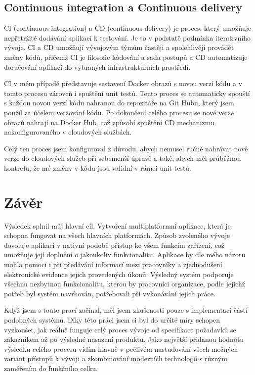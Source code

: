 \documentclass[
  biblatex,
  glossaries,
  index
]{kidiplom}
\begin{document}
\subsection{Continuous integration a Continuous delivery}
CI (continuous integration) a CD (continuous delivery) je proces, který umožňuje nepřetržité dodávání aplikací k testování. Je to v podstatě podmínka iterativního vývoje. CI a CD umožňují vývojovým týmům častěji a spolehlivěji provádět změny kódů, přičemž CI je filosofie kódování a sada postupů a CD automatizuje doručování aplikací do vybraných infrastrukturních prostředí. \cite{19}

CI v mém případě představuje sestavení Docker obrazů s novou verzí kódu a v tomto procesu zároveň i spuštění unit testů. Tento proces se automaticky spouští s každou novou verzí kódu nahranou do repozitáře na Git Hubu\cite{20}, který jsem použil za účelem verzování kódu. Po dokončení celého procesu se nové verze obrazů nahrají na Docker Hub, což způsobí spuštění CD mechanizmu nakonfigurovaného v cloudových službách.

Celý ten proces jsem konfiguroval z důvodu, abych nemusel ručně nahrávat nové verze do cloudových služeb při sebemenší úpravě a také, abych měl průběžnou kontrolu, že mé změny v kódu jsou validní v rámci unit testů.

\newpage

\section{Závěr}
Výsledek splnil můj hlavní cíl. Vytvoření multiplatformní aplikace, která je schopna fungovat na všech hlavních platformách. Způsob zvoleného vývoje dovoluje aplikaci v nativní podobě přístup ke všem funkcím zařízení, což umožňuje její doplnění o jakoukoliv funkcionalitu. Aplikace by dle mého názoru mohla pomoci i při předávání informací mezi pracovníky a zjednodušení elektronické evidence jejich provedených úkonů. Výsledný systém podporuje všechnu nezbytnou funkcionalitu, kterou by pracovníci organizace, podle jejichž potřeb byl systém navrhován, potřebovali při vykonávání jejich práce.

Když jsem s touto prací začínal, měl jsem zkušenosti pouze s implementací částí podobných systémů. Díky této práci jsem si byl do určité míry schopen vyzkoušet, jak reálně funguje celý proces vývoje od specifikace požadavků se zákazníkem až po výsledné nasazení produktu. Jako největší přidanou hodnotu výsledku celého procesu vidím hlavně v pečlivém nastudování všech možných variant přístupů k vývoji a zkombinování moderních technologií s různým zaměřením do funkčního celku.
\end{document}

